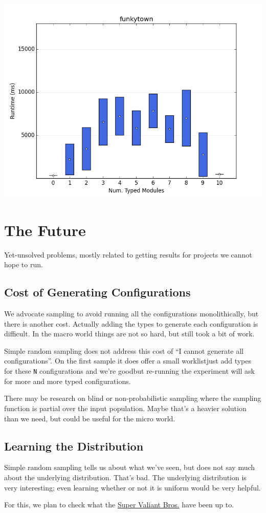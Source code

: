 \documentclass{article}
\begin{document}
\includegraphics[width=\textwidth]{sampling/funkytown-sampling-10.png}

\newpage
\section{The Future}
Yet-unsolved problems, mostly related to getting results for projects we cannot hope to run.


\subsection{Cost of Generating Configurations}
We advocate sampling to avoid running all the configurations monolithically, but there is another cost.
Actually adding the types to generate each configuration is difficult.
In the macro world things are not so hard, but still took a bit of work.

Simple random sampling does not address this cost of ``I cannot generate all configurations''.
On the first sample it does offer a small worklist\textemdash just add types for these \texttt{N} configurations and we're good\textemdash but re-running the experiment will ask for more and more typed configurations.

There may be research on blind or non-probabilistic sampling where the sampling function is partial over the input population.
Maybe that's a heavier solution than we need, but could be useful for the micro world.


\subsection{Learning the Distribution}
Simple random sampling tells us about what we've seen, but does not say much about the underlying distribution.
That's bad.
The underlying distribution is very interesting; even learning whether or not it is uniform would be very helpful.

For this, we plan to check what the \href{http://theory.stanford.edu/~valiant/papers/instanceOptFull.pdf}{Super Valiant Bros.} have been up to.
\end{document}
